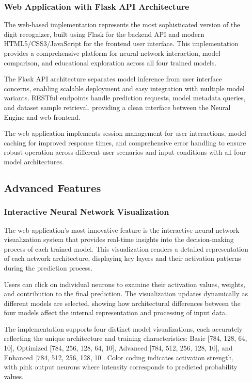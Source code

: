 \documentclass[11pt,a4paper]{report}
\begin{document}
\subsubsection{Web Application with Flask API Architecture}

The web-based implementation represents the most sophisticated version of the digit recognizer, built using Flask for the backend API and modern HTML5/CSS3/JavaScript for the frontend user interface. This implementation provides a comprehensive platform for neural network interaction, model comparison, and educational exploration across all four trained models.

The Flask API architecture separates model inference from user interface concerns, enabling scalable deployment and easy integration with multiple model variants. RESTful endpoints handle prediction requests, model metadata queries, and dataset sample retrieval, providing a clean interface between the Neural Engine and web frontend.

The web application implements session management for user interactions, model caching for improved response times, and comprehensive error handling to ensure robust operation across different user scenarios and input conditions with all four model architectures.

\subsection{Advanced Features}

\subsubsection{Interactive Neural Network Visualization}

The web application's most innovative feature is the interactive neural network visualization system that provides real-time insights into the decision-making process of each trained model. This visualization renders a detailed representation of each network architecture, displaying key layers and their activation patterns during the prediction process.

Users can click on individual neurons to examine their activation values, weights, and contribution to the final prediction. The visualization updates dynamically as different models are selected, showing how architectural differences between the four models affect the internal representation and processing of input data.

The implementation supports four distinct model visualizations, each accurately reflecting the unique architecture and training characteristics: Basic [784, 128, 64, 10], Optimized [784, 256, 128, 64, 10], Advanced [784, 512, 256, 128, 10], and Enhanced [784, 512, 256, 128, 10]. Color coding indicates activation strength, with pink output neurons where intensity corresponds to predicted probability values.
\end{document}
